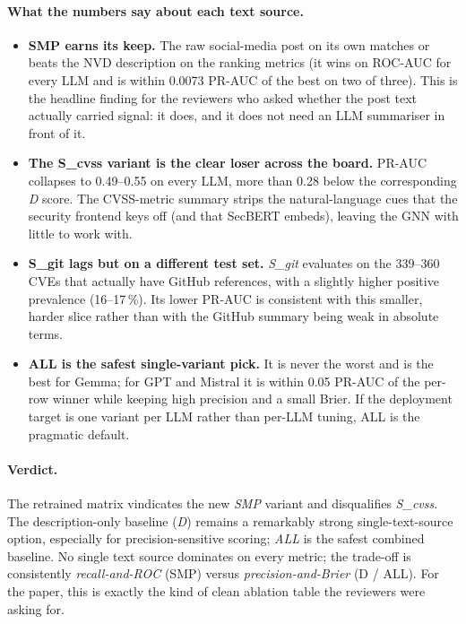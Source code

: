 \documentclass[11pt,a4paper]{article}
\begin{document}
\paragraph{What the numbers say about each text source.}
\begin{itemize}[leftmargin=*, itemsep=0pt]
    \item \textbf{SMP earns its keep.} The raw
    social-media post on its own matches or beats the NVD
    description on the ranking metrics (it wins on ROC-AUC
    for every LLM and is within 0.0073 PR-AUC of the best
    on two of three). This is the headline finding for the
    reviewers who asked whether the post text actually
    carried signal: it does, and it does not need an LLM
    summariser in front of it.
    \item \textbf{The S\_cvss variant is the clear loser
    across the board.} PR-AUC collapses to 0.49--0.55 on
    every LLM, more than 0.28 below the corresponding
    \emph{D} score. The CVSS-metric summary strips the
    natural-language cues that the security frontend keys
    off (and that SecBERT embeds), leaving the GNN with
    little to work with.
    \item \textbf{S\_git lags but on a different test
    set.} \emph{S\_git} evaluates on the 339--360 CVEs
    that actually have GitHub references, with a slightly
    higher positive prevalence (16--17\,\%). Its lower
    PR-AUC is consistent with this smaller, harder slice
    rather than with the GitHub summary being weak in
    absolute terms.
    \item \textbf{ALL is the safest single-variant pick.}
    It is never the worst and is the best for Gemma; for
    GPT and Mistral it is within 0.05 PR-AUC of the
    per-row winner while keeping high precision and a
    small Brier. If the deployment target is one
    variant per LLM rather than per-LLM tuning, ALL is the
    pragmatic default.
\end{itemize}

\paragraph{Verdict.}
The retrained matrix vindicates the new \emph{SMP}
variant and disqualifies \emph{S\_cvss}. The
description-only baseline (\emph{D}) remains a remarkably
strong single-text-source option, especially for
precision-sensitive scoring; \emph{ALL} is the safest
combined baseline. No single text source dominates on
every metric; the trade-off is consistently
\emph{recall-and-ROC} (SMP) versus \emph{precision-and-Brier}
(D / ALL). For the paper, this is exactly the kind of
clean ablation table the reviewers were asking for.
\end{document}
